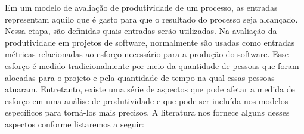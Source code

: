 Em um modelo de avaliação de produtividade de um processo, as entradas representam aquilo que é gasto para que o resultado do processo seja alcançado. Nessa etapa, são definidas quais entradas serão utilizadas. Na avaliação da produtividade em projetos de software, normalmente são usadas como entradas métricas relacionadas ao esforço necessário para a produção do software. Esse esforço é medido tradicionalmente por meio da quantidade de pessoas que foram alocadas para o projeto e pela quantidade de tempo na qual essas pessoas atuaram. Entretanto, existe uma série de aspectos que pode afetar a medida de esforço em uma análise de produtividade e que pode ser incluída nos modelos específicos para torná-los mais precisos. A literatura nos fornece alguns desses aspectos conforme listaremos a seguir:

\begin{itemize}


\end{itemize}
